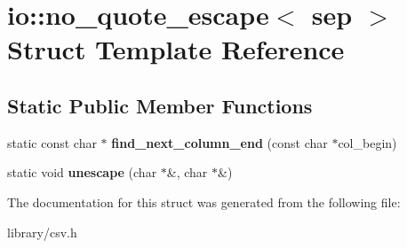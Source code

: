 \hypertarget{structio_1_1no__quote__escape}{}\section{io\+:\+:no\+\_\+quote\+\_\+escape$<$ sep $>$ Struct Template Reference}
\label{structio_1_1no__quote__escape}
\subsection*{Static Public Member Functions}
\begin{DoxyCompactItemize}
\item 
\mbox{\label{structio_1_1no__quote__escape_add17b043bb89445079a0448026ce86d0}} 
static const char $\ast$ {\bfseries find\+\_\+next\+\_\+column\+\_\+end} (const char $\ast$col\+\_\+begin)
\item 
\mbox{\label{structio_1_1no__quote__escape_af1c217f2c995d178a91c58235191b052}} 
static void {\bfseries unescape} (char $\ast$\&, char $\ast$\&)
\end{DoxyCompactItemize}


The documentation for this struct was generated from the following file\+:\begin{DoxyCompactItemize}
\item 
library/csv.\+h\end{DoxyCompactItemize}
